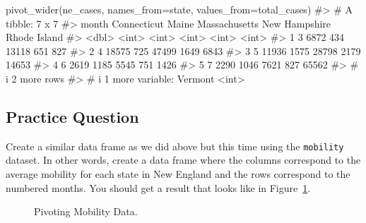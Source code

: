 \documentclass[
  letterpaper,
]{krantz}
\makeatletter
\newenvironment{Shaded}{\begin{snugshade}}{\end{snugshade}}
\newcommand{\AttributeTok}[1]{\textcolor[rgb]{0.40,0.45,0.13}{#1}}
\newcommand{\CommentTok}[1]{\textcolor[rgb]{0.37,0.37,0.37}{#1}}
\newcommand{\FunctionTok}[1]{\textcolor[rgb]{0.28,0.35,0.67}{#1}}
\newcommand{\NormalTok}[1]{\textcolor[rgb]{0.00,0.23,0.31}{#1}}
\newenvironment{kframe}{%
\medskip{}
\setlength{\fboxsep}{.8em}
 \def\at@end@of@kframe{}%
 \ifinner\ifhmode%
  \def\at@end@of@kframe{\end{minipage}}%
  \begin{minipage}{\columnwidth}%
 \fi\fi%
 \def\FrameCommand##1{\hskip\@totalleftmargin \hskip-\fboxsep
 \colorbox{shadecolor}{##1}\hskip-\fboxsep
     \hskip-\linewidth \hskip-\@totalleftmargin \hskip\columnwidth}%
 \MakeFramed {\advance\hsize-\width
   \@totalleftmargin\z@ \linewidth\hsize
   \@setminipage}}%
 {\par\unskip\endMakeFramed%
 \at@end@of@kframe}
\renewenvironment{Shaded}{\begin{kframe}}{\end{kframe}}
\makeatother
\begin{document}
\begin{Shaded}
\begin{Highlighting}[]
\FunctionTok{pivot\_wider}\NormalTok{(ne\_cases, }\AttributeTok{names\_from=}\NormalTok{state, }\AttributeTok{values\_from=}\NormalTok{total\_cases)}
\CommentTok{\#\textgreater{} \# A tibble: 7 x 7}
\CommentTok{\#\textgreater{}   month Connecticut Maine Massachusetts \textasciigrave{}New Hampshire\textasciigrave{} \textasciigrave{}Rhode Island\textasciigrave{}}
\CommentTok{\#\textgreater{}   \textless{}dbl\textgreater{}       \textless{}int\textgreater{} \textless{}int\textgreater{}         \textless{}int\textgreater{}           \textless{}int\textgreater{}          \textless{}int\textgreater{}}
\CommentTok{\#\textgreater{} 1     3        6872   434         13118             651            827}
\CommentTok{\#\textgreater{} 2     4       18575   725         47499            1649           6843}
\CommentTok{\#\textgreater{} 3     5       11936  1575         28798            2179          14653}
\CommentTok{\#\textgreater{} 4     6        2619  1185          5545             751           1426}
\CommentTok{\#\textgreater{} 5     7        2290  1046          7621             827          65562}
\CommentTok{\#\textgreater{} \# i 2 more rows}
\CommentTok{\#\textgreater{} \# i 1 more variable: Vermont \textless{}int\textgreater{}}
\end{Highlighting}
\end{Shaded}

\subsection{Practice Question}\label{practice-question-11}

Create a similar data frame as we did above but this time using the
\texttt{mobility} dataset. In other words, create a data frame where the
columns correspond to the average mobility for each state in New England
and the rows correspond to the numbered months. You should get a result
that looks like in Figure~\ref{fig-mobility-pivot}.

\begin{figure}


\caption{\label{fig-mobility-pivot}Pivoting Mobility Data.}

\end{figure}%
\end{document}
